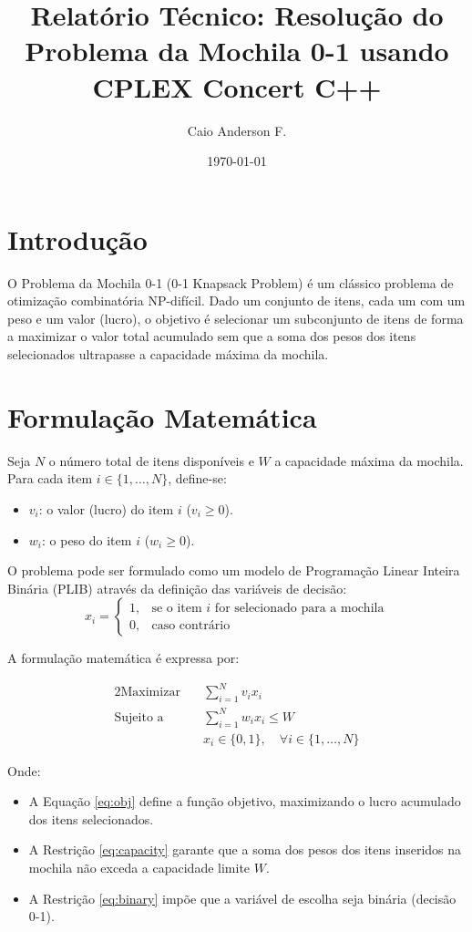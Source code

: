 \documentclass[12pt,a4paper]{article}
\title{Relatório Técnico: Resolução do Problema da Mochila 0-1 usando CPLEX Concert C++}
\author{Caio Anderson F.}
\date{\today}
\begin{document}
\maketitle

\section{Introdução}
O Problema da Mochila 0-1 (0-1 Knapsack Problem) é um clássico problema de otimização combinatória NP-difícil. Dado um conjunto de itens, cada um com um peso e um valor (lucro), o objetivo é selecionar um subconjunto de itens de forma a maximizar o valor total acumulado sem que a soma dos pesos dos itens selecionados ultrapasse a capacidade máxima da mochila.

\section{Formulação Matemática}
Seja $N$ o número total de itens disponíveis e $W$ a capacidade máxima da mochila. Para cada item $i \in \{1, \dots, N\}$, define-se:
\begin{itemize}
    \item $v_i$: o valor (lucro) do item $i$ ($v_i \ge 0$).
    \item $w_i$: o peso do item $i$ ($w_i \ge 0$).
\end{itemize}

O problema pode ser formulado como um modelo de Programação Linear Inteira Binária (PLIB) através da definição das variáveis de decisão:
\[
x_i = \begin{cases} 
1, & \text{se o item } i \text{ for selecionado para a mochila} \\
0, & \text{caso contrário}
\end{cases}
\]

A formulação matemática é expressa por:

\begin{alignat}{2}
\text{Maximizar} \quad & \sum_{i=1}^{N} v_i x_i \label{eq:obj} \\
\text{Sujeito a} \quad & \sum_{i=1}^{N} w_i x_i \le W \label{eq:capacity} \\
& x_i \in \{0, 1\}, \quad \forall i \in \{1, \dots, N\} \label{eq:binary}
\end{alignat}

Onde:
\begin{itemize}
    \item A Equação \eqref{eq:obj} define a função objetivo, maximizando o lucro acumulado dos itens selecionados.
    \item A Restrição \eqref{eq:capacity} garante que a soma dos pesos dos itens inseridos na mochila não exceda a capacidade limite $W$.
    \item A Restrição \eqref{eq:binary} impõe que a variável de escolha seja binária (decisão 0-1).
\end{itemize}
\end{document}
